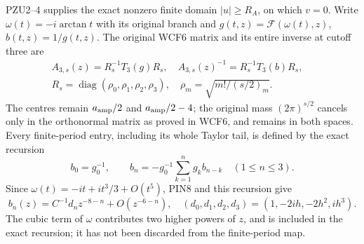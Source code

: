 \documentclass[11pt]{article}
\begin{document}
PZU2--4 supplies the exact nonzero finite domain $|u|\ge R_A$,
on which $v=0$. Write $\omega(t)=-i\arctan t$ with its original
branch and
$g(t,z)=\mathcal F(\omega(t),z)$, $b(t,z)=1/g(t,z)$.
The original WCF6 matrix and its entire inverse at cutoff three are
\[
 \begin{gathered}
 A_{3,s}(z)=R_s^{-1}T_3(g)R_s,\quad
 A_{3,s}(z)^{-1}=R_s^{-1}T_3(b)R_s,\quad
 \\
 R_s=\operatorname{diag}(\rho_0,\rho_1,\rho_2,\rho_3),\quad
 \rho_m=\sqrt{m!/(s/2)_m}.
 \end{gathered}
 \tag{PIN9}
\]
The centres remain $a_{\rm amp}/2$ and $a_{\rm amp}/2-4$;
the original mass $(2\pi)^{s/2}$ cancels only in the orthonormal
matrix as proved in WCF6, and remains in both spaces.
Every finite-period entry, including its whole Taylor tail, is
defined by the exact recursion
\[
 b_0=g_0^{-1},\qquad
 b_n=-g_0^{-1}\sum_{k=1}^n g_kb_{n-k}\quad(1\le n\le3).
 \tag{PIN10}
\]
Since $\omega(t)=-it+it^3/3+O(t^5)$, PIN8 and this recursion give
\[
 b_n(z)=C^{-1}d_nz^{-8-n}+O(z^{-6-n}),\quad
 (d_0,d_1,d_2,d_3)=(1,-2ih,-2h^2,ih^3).
 \tag{PIN11}
\]
The cubic term of $\omega$ contributes two higher powers of $z$,
and is included in the exact recursion; it has not been discarded
from the finite-period map.
\end{document}
